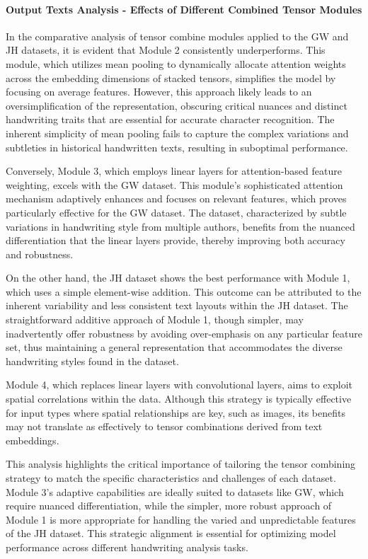 \paragraph*{Output Texts Analysis - Effects of Different Combined Tensor Modules}
In the comparative analysis of tensor combine modules applied to the GW and JH datasets, it is evident that Module 2 consistently underperforms. This module, which utilizes mean pooling to dynamically allocate attention weights across the embedding dimensions of stacked tensors, simplifies the model by focusing on average features. However, this approach likely leads to an oversimplification of the representation, obscuring critical nuances and distinct handwriting traits that are essential for accurate character recognition. The inherent simplicity of mean pooling fails to capture the complex variations and subtleties in historical handwritten texts, resulting in suboptimal performance.

Conversely, Module 3, which employs linear layers for attention-based feature weighting, excels with the GW dataset. This module's sophisticated attention mechanism adaptively enhances and focuses on relevant features, which proves particularly effective for the GW dataset. The dataset, characterized by subtle variations in handwriting style from multiple authors, benefits from the nuanced differentiation that the linear layers provide, thereby improving both accuracy and robustness.

On the other hand, the JH dataset shows the best performance with Module 1, which uses a simple element-wise addition. This outcome can be attributed to the inherent variability and less consistent text layouts within the JH dataset. The straightforward additive approach of Module 1, though simpler, may inadvertently offer robustness by avoiding over-emphasis on any particular feature set, thus maintaining a general representation that accommodates the diverse handwriting styles found in the dataset.

Module 4, which replaces linear layers with convolutional layers, aims to exploit spatial correlations within the data. Although this strategy is typically effective for input types where spatial relationships are key, such as images, its benefits may not translate as effectively to tensor combinations derived from text embeddings.

This analysis highlights the critical importance of tailoring the tensor combining strategy to match the specific characteristics and challenges of each dataset. Module 3's adaptive capabilities are ideally suited to datasets like GW, which require nuanced differentiation, while the simpler, more robust approach of Module 1 is more appropriate for handling the varied and unpredictable features of the JH dataset. This strategic alignment is essential for optimizing model performance across different handwriting analysis tasks.


